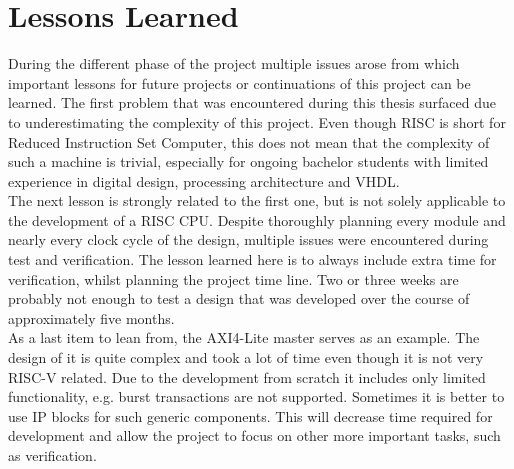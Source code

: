 \chapter{Lessons Learned}
During the different phase of the project multiple issues arose from which important lessons for future projects or continuations of this project can be learned. The first problem that was encountered during this thesis surfaced due to underestimating the complexity of this project. Even though \ac{RISC} is short for Reduced Instruction Set Computer, this does not mean that the complexity of such a machine is trivial, especially for ongoing bachelor students with limited experience in digital design, processing architecture and \ac{VHDL}.\\
The next lesson is strongly related to the first one, but is not solely applicable to the development of a \ac{RISC} \ac{CPU}. Despite thoroughly planning every module and nearly every clock cycle of the design, multiple issues were encountered during test and verification. The lesson learned here is to always include extra time for verification, whilst planning the project time line. Two or three weeks are probably not enough to test a design that was developed over the course of approximately five months. \\
As a last item to lean from, the \ac{AXI4-Lite} master serves as an example. The design of it is quite complex and took a lot of time even though it is not very RISC-V related. Due to the development from scratch it includes only limited functionality, e.g. burst transactions are not supported. Sometimes it is better to use IP blocks for such generic components. This will decrease time required for development and allow the project to focus on other more important tasks, such as verification.